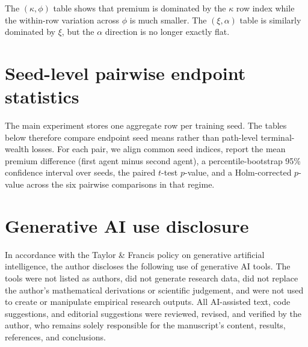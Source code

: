 \documentclass[]{interact}
\theoremstyle{plain}
\theoremstyle{definition}
\theoremstyle{remark}
\newcommand{\1}[1]{\mathbf{1}_{\{#1\}}}
\begin{document}
The $(\kappa, \phi)$ table shows that premium is dominated by the $\kappa$ row index while the within-row variation across $\phi$ is much smaller. The $(\xi,\alpha)$ table is similarly dominated by $\xi$, but the $\alpha$ direction is no longer exactly flat.

\section{Seed-level pairwise endpoint statistics}\label{app:pairwise-stats}

The main experiment stores one aggregate row per training seed. The tables below therefore compare endpoint seed means rather than path-level terminal-wealth losses. For each pair, we align common seed indices, report the mean premium difference (first agent minus second agent), a percentile-bootstrap 95\% confidence interval over seeds, the paired $t$-test $p$-value, and a Holm-corrected $p$-value across the six pairwise comparisons in that regime.

\begin{table}[h]
\centering
\caption{Regime-I pairwise seed-level premium differences at $n=10^5$. Positive values favour the first agent in the comparison.}
\label{tab:pairwise-regime-i}
\small

\end{table}

\begin{table}[h]
\centering
\caption{Regime-II pairwise seed-level premium differences at $n=10^6$. Positive values favour the first agent in the comparison. No pair remains significant after Holm correction, reflecting the seed-level noise in the institutional-scale premium ranking.}
\label{tab:pairwise-regime-ii}
\small

\end{table}

\section{Generative AI use disclosure}\label{app:ai-use}

In accordance with the Taylor \& Francis policy on generative artificial intelligence, the author discloses the following use of generative AI tools. The tools were not listed as authors, did not generate research data, did not replace the author's mathematical derivations or scientific judgement, and were not used to create or manipulate empirical research outputs. All AI-assisted text, code suggestions, and editorial suggestions were reviewed, revised, and verified by the author, who remains solely responsible for the manuscript's content, results, references, and conclusions.
\end{document}
